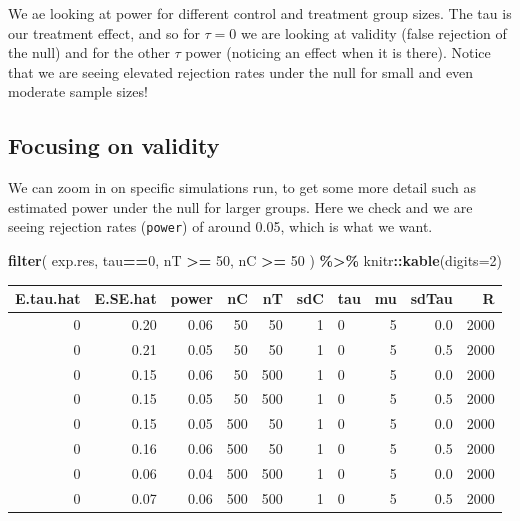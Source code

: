 \documentclass[
]{book}
\newenvironment{Shaded}{\begin{snugshade}}{\end{snugshade}}
\newcommand{\AttributeTok}[1]{\textcolor[rgb]{0.13,0.29,0.53}{#1}}
\newcommand{\DecValTok}[1]{\textcolor[rgb]{0.00,0.00,0.81}{#1}}
\newcommand{\FunctionTok}[1]{\textcolor[rgb]{0.13,0.29,0.53}{\textbf{#1}}}
\newcommand{\NormalTok}[1]{#1}
\newcommand{\SpecialCharTok}[1]{\textcolor[rgb]{0.81,0.36,0.00}{\textbf{#1}}}
\begin{document}
We ae looking at power for different control and treatment group sizes. The tau is our treatment effect, and so for \(\tau = 0\) we are looking at validity (false rejection of the null) and for the other \(\tau\) power (noticing an effect when it is there).
Notice that we are seeing elevated rejection rates under the null for small and even moderate sample sizes!

\subsection{Focusing on validity}\label{focusing-on-validity}

We can zoom in on specific simulations run, to get some more detail
such as estimated power under the null for larger groups. Here we check
and we are seeing rejection rates (\texttt{power}) of around 0.05, which is what we want.

\begin{Shaded}
\begin{Highlighting}[]
\FunctionTok{filter}\NormalTok{( exp.res, tau}\SpecialCharTok{==}\DecValTok{0}\NormalTok{, nT }\SpecialCharTok{\textgreater{}=} \DecValTok{50}\NormalTok{, nC }\SpecialCharTok{\textgreater{}=} \DecValTok{50}\NormalTok{ ) }\SpecialCharTok{\%\textgreater{}\%}
\NormalTok{  knitr}\SpecialCharTok{::}\FunctionTok{kable}\NormalTok{(}\AttributeTok{digits=}\DecValTok{2}\NormalTok{)}
\end{Highlighting}
\end{Shaded}

\begin{tabular}{r|r|r|r|r|r|l|r|r|r}
\hline
E.tau.hat & E.SE.hat & power & nC & nT & sdC & tau & mu & sdTau & R\\
\hline
0 & 0.20 & 0.06 & 50 & 50 & 1 & 0 & 5 & 0.0 & 2000\\
\hline
0 & 0.21 & 0.05 & 50 & 50 & 1 & 0 & 5 & 0.5 & 2000\\
\hline
0 & 0.15 & 0.06 & 50 & 500 & 1 & 0 & 5 & 0.0 & 2000\\
\hline
0 & 0.15 & 0.05 & 50 & 500 & 1 & 0 & 5 & 0.5 & 2000\\
\hline
0 & 0.15 & 0.05 & 500 & 50 & 1 & 0 & 5 & 0.0 & 2000\\
\hline
0 & 0.16 & 0.06 & 500 & 50 & 1 & 0 & 5 & 0.5 & 2000\\
\hline
0 & 0.06 & 0.04 & 500 & 500 & 1 & 0 & 5 & 0.0 & 2000\\
\hline
0 & 0.07 & 0.06 & 500 & 500 & 1 & 0 & 5 & 0.5 & 2000\\
\hline
\end{tabular}
\end{document}

